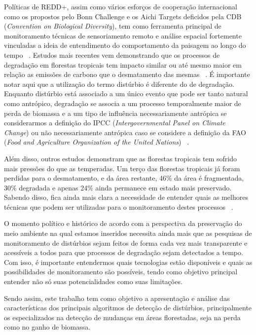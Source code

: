 \documentclass[twocolumn]{article}
\begin{document}
Políticas de REDD+, assim como vários esforços de cooperação internacional como os propostos pelo Bonn Challenge e os Aichi Targets deficidos pela CDB (\textit{Convention on Biological Diversity}), tem como ferramenta principal de monitoramento técnicas de sensoriamento remoto e análise espacial fortemente vinculadas a ideia de entendimento do comportamento da paisagem ao longo do tempo ~\cite{BOS2019295, CROUZEILLES2019}. Estudos mais recentes vem demonstrando que os processos de degradação em florestas tropicais tem impacto similar ou até mesmo maior em relação as emissões de carbono que o desmatamento das mesmas ~\cite{Harris1573, Houghton2012, Grace2014}. É importante notar aqui que a utilização do termo distúrbio é diferente do de degradação. Enquanto distúrbio está associado a um único evento que pode ser tanto natural como antrópico, degradação se associa a um processo temporalmente maior de perda de biomassa e a um tipo de influência necessariamente antrópica se considerarmos a definição do IPCC (\textit{Intergovernmental Panel on Climate Change}) ou não necessariamente antrópica caso se considere a definição da FAO (\textit{Food and Agriculture Organization of the United Nations}) ~\cite{Hirschmugl2017}. 
\par
Além disso, outros estudos demonstram que as florestas tropicais tem sofrido mais pressões do que as temperadas. Um terço das florestas tropicais já foram perdidas para o desmatamento, e da área restante, 46\% da área é fragmentada, 30\% degradada e apenas 24\% ainda permanece em estado mais preservado. Sabendo disso, fica ainda mais clara a necessidade de entender quais as melhores técnicas que podem ser utilizadas para o monitoramento destes processos ~\cite{Hirschmugl2017}. 
\par
O momento político e histórico de acordo com a perspectiva da preservação do meio ambiente na qual estamos inseridos necessita ainda mais que as pesquisas de monitoramento de distúrbios sejam feitos de forma cada vez mais transparente e acessíveis a todos para que processos de degradação sejam detectados a tempo. Com isso, é importante entendermos quais tecnologias estão disponíveis e quais as possibilidades de monitoramento são possíveis, tendo como objetivo principal entender não só suas potencialidades como suas limitações. 
\par
Sendo assim, este trabalho tem como objetivo a apresentação e análise das características dos principais algoritmos de detecção de distúrbios, principalmente os especializados na detecção de mudanças em áreas florestadas, seja na perda como no ganho de biomassa.
\par
\end{document}

